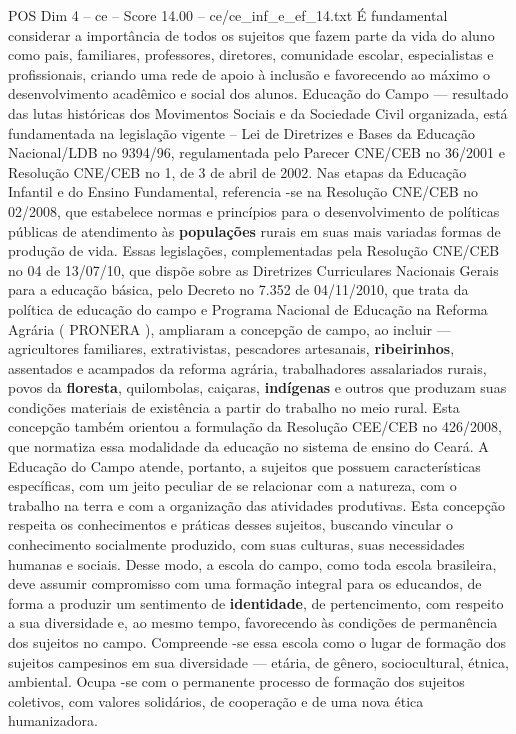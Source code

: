 \begin{textsample}{POS Dim 4 – ce – Score 14.00 – ce/ce\_inf\_e\_ef\_14.txt}
É fundamental considerar a importância de todos os sujeitos que fazem parte da vida do aluno como pais, familiares, professores, diretores, comunidade escolar, especialistas e profissionais, criando uma rede de apoio à inclusão e favorecendo ao máximo o desenvolvimento acadêmico e social dos alunos.
Educação do Campo — resultado das lutas históricas dos Movimentos Sociais e da Sociedade Civil organizada, está fundamentada na legislação vigente – Lei de Diretrizes e Bases da Educação Nacional/LDB no 9394/96, regulamentada pelo Parecer CNE/CEB no 36/2001 e Resolução CNE/CEB no 1, de 3 de abril de 2002.
Nas etapas da Educação Infantil e do Ensino Fundamental, referencia -se na Resolução CNE/CEB no 02/2008, que estabelece normas e princípios para o desenvolvimento de políticas públicas de atendimento às \textbf{populações} rurais em suas mais variadas formas de produção de vida.
Essas legislações, complementadas pela Resolução CNE/CEB no 04 de 13/07/10, que dispõe sobre as Diretrizes Curriculares Nacionais Gerais para a educação básica, pelo Decreto no 7.352 de 04/11/2010, que trata da política de educação do campo e Programa Nacional de Educação na Reforma Agrária ( PRONERA ), ampliaram a concepção de campo, ao incluir — agricultores familiares, extrativistas, pescadores artesanais, \textbf{ribeirinhos}, assentados e acampados da reforma agrária, trabalhadores assalariados rurais, povos da \textbf{floresta}, quilombolas, caiçaras, \textbf{indígenas} e outros que produzam suas condições materiais de existência a partir do trabalho no meio rural.
Esta concepção também orientou a formulação da Resolução CEE/CEB no 426/2008, que normatiza essa modalidade da educação no sistema de ensino do Ceará.
A Educação do Campo atende, portanto, a sujeitos que possuem características específicas, com um jeito peculiar de se relacionar com a natureza, com o trabalho na terra e com a organização das atividades produtivas.
Esta concepção respeita os conhecimentos e práticas desses sujeitos, buscando vincular o conhecimento socialmente produzido, com suas culturas, suas necessidades humanas e sociais.
Desse modo, a escola do campo, como toda escola brasileira, deve assumir compromisso com uma formação integral para os educandos, de forma a produzir um sentimento de \textbf{identidade}, de pertencimento, com respeito a sua diversidade e, ao mesmo tempo, favorecendo às condições de permanência dos sujeitos no campo.
Compreende -se essa escola como o lugar de formação dos sujeitos campesinos em sua diversidade — etária, de gênero, sociocultural, étnica, ambiental.
Ocupa -se com o permanente processo de formação dos sujeitos coletivos, com valores solidários, de cooperação e de uma nova ética humanizadora.

\end{textsample}
